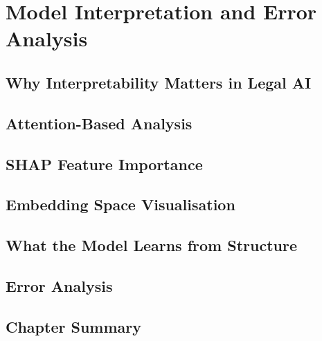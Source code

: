 \chapter{Model Interpretation and Error Analysis}

\section{Why Interpretability Matters in Legal AI}
\section{Attention-Based Analysis}
\section{SHAP Feature Importance}
\section{Embedding Space Visualisation}
\section{What the Model Learns from Structure}
\section{Error Analysis}
\section{Chapter Summary}
